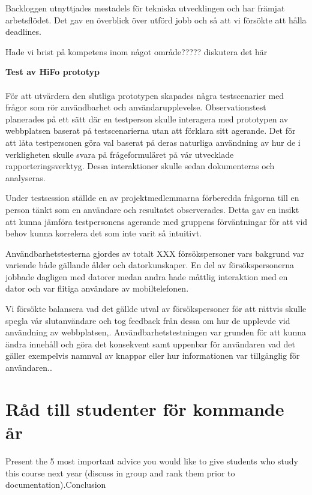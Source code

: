 \documentclass[12pt]{article}
\begin{document}
Backloggen utnyttjades mestadels för tekniska utvecklingen och har främjat arbetsflödet. Det gav en överblick över utförd jobb och så att vi försökte att hålla deadlines. 

Hade vi brist på kompetens inom något område????? diskutera det här


\textbf{Test av HiFo prototyp }\\\\
För att utvärdera den slutliga prototypen skapades några testscenarier med frågor som rör användbarhet och användarupplevelse. Observationstest planerades på ett sätt där en  testperson skulle interagera med prototypen av webbplatsen baserat på testscenarierna utan att förklara sitt agerande. Det för att låta testpersonen göra val baserat på deras naturliga användning av hur de i verkligheten skulle svara på frågeformuläret på vår utvecklade rapporteringsverktyg. Dessa interaktioner skulle sedan dokumenteras och  analyseras.   

Under testsession ställde en av projektmedlemmarna förberedda frågorna till en person tänkt som en användare och resultatet observerades. Detta gav en insikt att kunna jämföra testpersonens agerande med gruppens förväntningar för att vid behov kunna korrelera det som inte varit så intuitivt.  

Användbarhetstesterna gjordes av totalt XXX försökspersoner vars bakgrund var variende både gällande ålder och datorkunskaper. En del av försökspersonerna jobbade dagligen med datorer medan andra hade måttlig interaktion med en dator och var flitiga användare av mobiltelefonen. 

Vi försökte balansera vad det gällde utval av försökspersoner för att rättvis skulle spegla vår slutanvändare och tog feedback från dessa om hur de upplevde vid användning av webbplatsen,. Användbarhetstestningen var grunden för att kunna ändra innehåll och göra det konsekvent  samt uppenbar för användaren vad det gäller exempelvis namnval av knappar eller hur informationen var tillgänglig för användaren.. 

\section{Råd till studenter för kommande år}
Present the 5 most important advice you would like to give students who study this course next year (discuss in group and rank them prior to documentation).Conclusion
\end{document}
